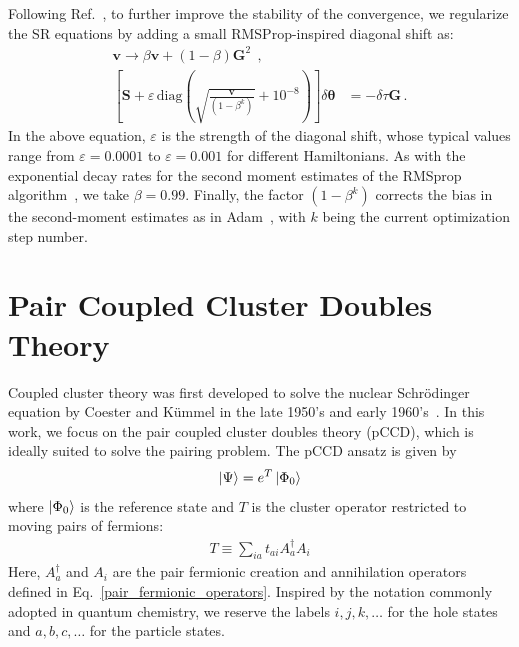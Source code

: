 \documentclass[aps,pre,floatfix,showpacs,twocolumn, preprintnumbers]{revtex4-1}
\begin{document}
Following Ref.~\cite{Lovato:2022tjh}, to further improve the stability of the convergence, we regularize the SR equations by adding a small RMSProp-inspired diagonal shift as:
\begin{align}
    \bm v \to \beta \bm v + (1-\beta)\bm G^2\ \ ,&\nonumber\\
    \left[\bm S + \varepsilon\,\text{diag}\left(\sqrt{\frac{\bm v}{ (1-\beta^k)}}+10^{-8}\right)\right]\delta\bm\theta &= -\delta\tau\bm G\, .
    \label{sr_update_new}
\end{align}
In the above equation, $\varepsilon$ is the strength of the diagonal shift, whose typical values range from $\varepsilon=0.0001$ to $\varepsilon=0.001$ for different Hamiltonians. As with the exponential decay rates for the second moment estimates of the RMSprop algorithm~\cite{Hinton:2018}, we take $\beta=0.99$. Finally, the factor $(1-\beta^k)$ corrects the bias in the second-moment estimates as in Adam~\cite{Kingma:2014}, with $k$ being the current optimization step number. 

\section{Pair Coupled Cluster Doubles Theory}
\label{sec:coupled_cluster}
Coupled cluster theory was first developed to solve the nuclear Schr\"odinger equation by Coester and K\"{u}mmel in the late 1950's and early 1960's~\cite{Coester:1958,Coester:1960}. In this work, we focus on the pair coupled cluster doubles theory (pCCD), which is ideally suited to solve the pairing problem. The pCCD ansatz is given by
\begin{align}
\label{cc_ansatz}
\ket{\Psi}=e^{T}\ket{\Phi_0}
\end{align}
where $\ket{\Phi_0}$ is the reference state and $T$ is the cluster operator restricted to moving pairs of fermions:
\begin{align}
T\equiv\sum_{ia}t_{ai}A^\dagger_a A_i
\end{align}
Here, $A^\dagger_a$ and $A_i$ are the pair fermionic creation and annihilation operators defined in Eq.~\eqref{pair_fermionic_operators}. Inspired by the notation commonly adopted in quantum chemistry, we reserve the labels $i,j,k,\dots$ for the hole states and $a,b,c,\dots$ for the particle states.
\end{document}

